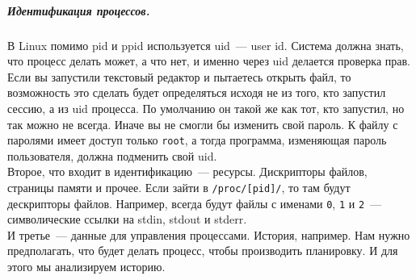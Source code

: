 \documentclass{article}
\begin{document}
    \subparagraph{Идентификация процессов.}
    В Linux помимо pid и ppid используется uid~--- user id. Система должна знать, что процесс делать может, а что нет, и именно через uid делается проверка прав. Если вы запустили текстовый редактор и пытаетесь открыть файл, то возможность это сделать будет определяться исходя не из того, кто запустил сессию, а из uid процесса. По умолчанию он такой же как тот, кто запустил, но так можно не всегда. Иначе вы не смогли бы изменить свой пароль. К файлу с паролями имеет доступ только \texttt{root}, а тогда программа, изменяющая пароль пользователя, должна подменить свой uid.\\
    Второе, что входит в идентификацию~--- ресурсы. Дискрипторы файлов, страницы памяти и прочее. Если зайти в \texttt{/proc/[pid]/}, то там будут дескрипторы файлов. Например, всегда будут файлы с именами \texttt{0}, \texttt{1} и \texttt{2}~--- символические ссылки на stdin, stdout и stderr.\\
    И третье~--- данные для управления процессами. История, например. Нам нужно предполагать, что будет делать процесс, чтобы производить планировку. И для этого мы анализируем историю.
\end{document}

